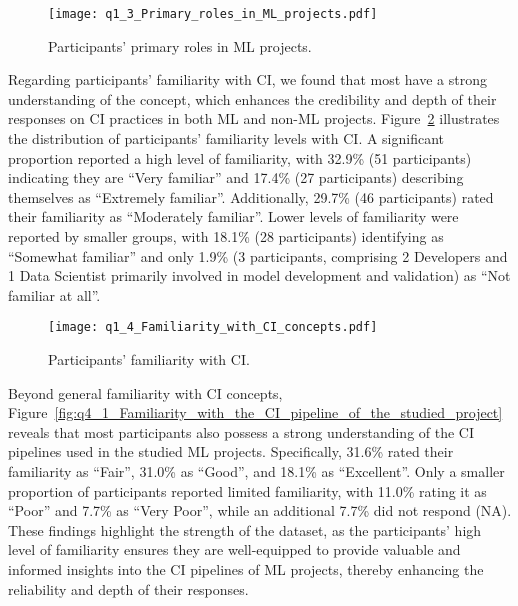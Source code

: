 \begin{figure}
	\centering
	\texttt{[image: q1\_3\_Primary\_roles\_in\_ML\_projects.pdf]}
	\caption{Participants' primary roles in ML projects.}
	\label{fig:q1_3_Primary_roles_in_ML_projects}       %
\end{figure}

Regarding participants' familiarity with CI, we found that most have a strong understanding of the concept, which enhances the credibility and depth of their responses on CI practices in both ML and non-ML projects.
Figure~\ref{fig:q1_4_Familiarity_with_CI_concepts} illustrates the distribution of participants' familiarity levels with CI. A significant proportion reported a high level of familiarity, with 32.9\% (51 participants) indicating they are ``Very familiar'' and 17.4\% (27 participants) describing themselves as ``Extremely familiar''. Additionally, 29.7\% (46 participants) rated their familiarity as ``Moderately familiar''. Lower levels of familiarity were reported by smaller groups, with 18.1\% (28 participants) identifying as ``Somewhat familiar'' and only 1.9\% (3 participants, comprising 2 Developers and 1 Data Scientist primarily involved in model development and validation) as ``Not familiar at all''.

\begin{figure}
	\centering
	\texttt{[image: q1\_4\_Familiarity\_with\_CI\_concepts.pdf]}
	\caption{Participants' familiarity with CI.}
	\label{fig:q1_4_Familiarity_with_CI_concepts}       %
\end{figure}

Beyond general familiarity with CI concepts, Figure~\ref{fig:q4_1_Familiarity_with_the_CI_pipeline_of_the_studied_project} reveals that most participants also possess a strong understanding of the CI pipelines used in the studied ML projects. Specifically, 31.6\% rated their familiarity as ``Fair'', 31.0\% as ``Good'', and 18.1\% as ``Excellent''. 
Only a smaller proportion of participants reported limited familiarity, with 11.0\% rating it as ``Poor'' and 7.7\% as ``Very Poor'', while an additional 7.7\% did not respond (NA). 
These findings highlight the strength of the dataset, as the participants' high level of familiarity ensures they are well-equipped to provide valuable and informed insights into the CI pipelines of ML projects, thereby enhancing the reliability and depth of their responses.

